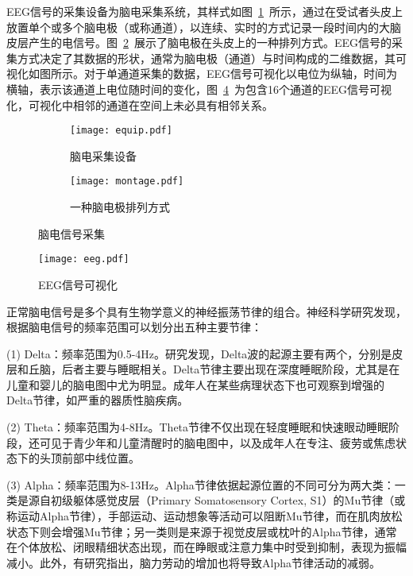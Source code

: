 EEG信号的采集设备为脑电采集系统，其样式如图~\ref{fig:equip}~所示，通过在受试者头皮上放置单个或多个脑电极（或称通道），以连续、实时的方式记录一段时间内的大脑皮层产生的电信号。图~\ref{fig:montage}~展示了脑电极在头皮上的一种排列方式。EEG信号的采集方式决定了其数据的形状，通常为脑电极（通道）与时间构成的二维数据，其可视化如图所示。对于单通道采集的数据，EEG信号可视化以电位为纵轴，时间为横轴，表示该通道上电位随时间的变化，图~\ref{fig:eeg}~为包含16个通道的EEG信号可视化，可视化中相邻的通道在空间上未必具有相邻关系。
\begin{figure}[h]
    \centering
    \begin{subfigure}{0.4\textwidth}
      \texttt{[image: equip.pdf]}
      \caption{脑电采集设备}
      \label{fig:equip}
    \end{subfigure}\qquad
    \begin{subfigure}{0.4\textwidth}
      \texttt{[image: montage.pdf]}
      \caption{一种脑电极排列方式}
      \label{fig:montage}
    \end{subfigure}
    \caption{脑电信号采集}
    \label{fig:eeg-cap}
  \end{figure}
\begin{figure}
    \centering
    \texttt{[image: eeg.pdf]}
    \caption{EEG信号可视化}
    \label{fig:eeg}
\end{figure}

正常脑电信号是多个具有生物学意义的神经振荡节律的组合\cite{1022779250.nh}。神经科学研究发现，根据脑电信号的频率范围可以划分出五种主要节律：

(1) Delta：频率范围为0.5-4Hz。研究发现，Delta波的起源主要有两个，分别是皮层和丘脑，后者主要与睡眠相关\cite{kropotov2010quantitative}。Delta节律主要出现在深度睡眠阶段，尤其是在儿童和婴儿的脑电图中尤为明显。成年人在某些病理状态下也可观察到增强的Delta节律，如严重的器质性脑疾病。

(2) Theta：频率范围为4-8Hz。Theta节律不仅出现在轻度睡眠和快速眼动睡眠阶段，还可见于青少年和儿童清醒时的脑电图中，以及成年人在专注、疲劳或焦虑状态下的头顶前部中线位置\cite{ishihara1966activation}\cite{ishihara1967interaction}。

(3) Alpha：频率范围为8-13Hz。Alpha节律依据起源位置的不同可分为两大类：一类是源自初级躯体感觉皮层（Primary Somatosensory Cortex, S1）的Mu节律（或称运动Alpha节律）\cite{hari1997human}，手部运动、运动想象等活动可以阻断Mu节律，而在肌肉放松状态下则会增强Mu节律；另一类则是来源于视觉皮层或枕叶的Alpha节律，通常在个体放松、闭眼精细状态出现，而在睁眼或注意力集中时受到抑制，表现为振幅减小。此外，有研究指出，脑力劳动的增加也将导致Alpha节律活动的减弱\cite{1022779250.nh}。

